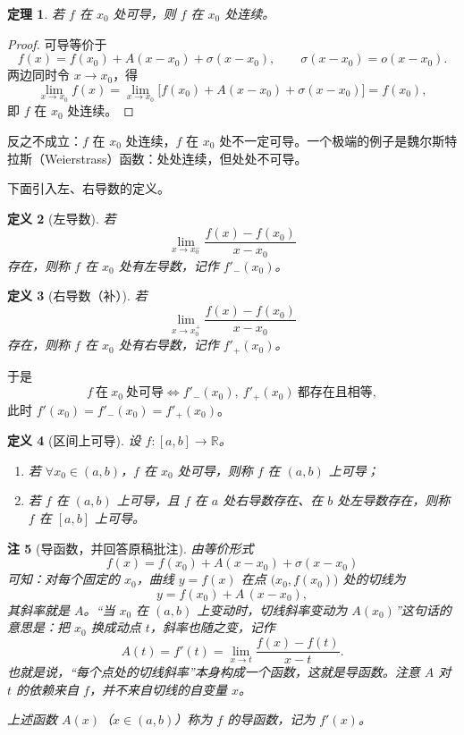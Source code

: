 \documentclass[UTF8,11pt]{ctexart}
\theoremstyle{cnthm}
\newtheorem{thm}{定理}[section]
\newtheorem{defn}[thm]{定义}
\newtheorem{rem}[thm]{注}
\begin{document}
\begin{thm}
若 $f$ 在 $x_0$ 处可导，则 $f$ 在 $x_0$ 处连续。
\end{thm}

\begin{proof}
可导等价于
\[
f(x)=f(x_0)+A(x-x_0)+\sigma(x-x_0),\qquad \sigma(x-x_0)=o(x-x_0).
\]
两边同时令 $x\to x_0$，得
\[
\lim_{x\to x_0}f(x)
=\lim_{x\to x_0}\bigl[f(x_0)+A(x-x_0)+\sigma(x-x_0)\bigr]=f(x_0),
\]
即 $f$ 在 $x_0$ 处连续。
\end{proof}

反之不成立：$f$ 在 $x_0$ 处连续，$f$ 在 $x_0$ 处不一定可导。一个极端的例子是魏尔斯特拉斯（Weierstrass）函数：处处连续，但处处不可导。

下面引入左、右导数的定义。

\begin{defn}[左导数]
若
\[
\lim_{x\to x_0^-}\frac{f(x)-f(x_0)}{x-x_0}
\]
存在，则称 $f$ 在 $x_0$ 处有左导数，记作 $f'_-(x_0)$。
\end{defn}

\begin{defn}[右导数（补）]
若
\[
\lim_{x\to x_0^+}\frac{f(x)-f(x_0)}{x-x_0}
\]
存在，则称 $f$ 在 $x_0$ 处有右导数，记作 $f'_+(x_0)$。
\end{defn}

于是
\[
f\ \text{在}\ x_0\ \text{处可导}
\iff f'_-(x_0),\ f'_+(x_0)\ \text{都存在且相等},
\]
此时 $f'(x_0)=f'_-(x_0)=f'_+(x_0)$。

\begin{defn}[区间上可导]
设 $f:[a,b]\to\mathbb{R}$。
\begin{enumerate}
\item 若 $\forall x_0\in(a,b)$，$f$ 在 $x_0$ 处可导，则称 $f$ 在 $(a,b)$ 上可导；
\item 若 $f$ 在 $(a,b)$ 上可导，且 $f$ 在 $a$ 处右导数存在、在 $b$ 处左导数存在，则称 $f$ 在 $[a,b]$ 上可导。
\end{enumerate}
\end{defn}

\begin{rem}[导函数，并回答原稿批注]
由等价形式
\[
f(x)=f(x_0)+A(x-x_0)+\sigma(x-x_0)
\]
可知：对每个固定的 $x_0$，曲线 $y=f(x)$ 在点 $\bigl(x_0,f(x_0)\bigr)$ 处的切线为
\[
y=f(x_0)+A\,(x-x_0),
\]
其斜率就是 $A$。“当 $x_0$ 在 $(a,b)$ 上变动时，切线斜率变动为 $A(x_0)$”这句话的意思是：把 $x_0$ 换成动点 $t$，斜率也随之变，记作
\[
A(t)=f'(t)=\lim_{x\to t}\frac{f(x)-f(t)}{x-t}.
\]
也就是说，“每个点处的切线斜率”本身构成一个函数，这就是导函数。注意 $A$ 对 $t$ 的依赖来自 $f$，并不来自切线的自变量 $x$。

上述函数 $A(x)$（$x\in(a,b)$）称为 $f$ 的导函数，记为 $f'(x)$。
\end{rem}
\end{document}
